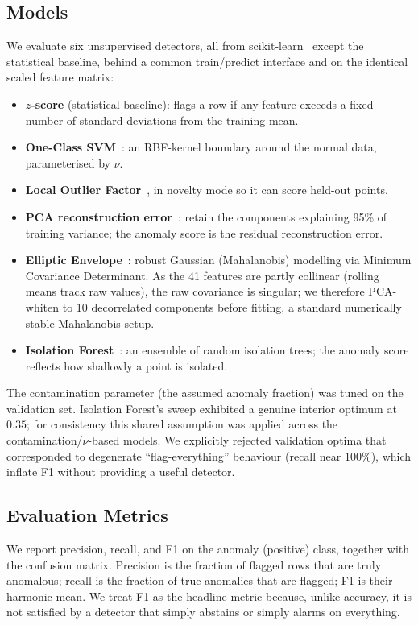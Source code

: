 \documentclass[conference]{IEEEtran}
\begin{document}
\subsection{Models}
We evaluate six unsupervised detectors, all from
scikit-learn~\cite{pedregosa2011} except the statistical baseline, behind a
common train/predict interface and on the identical scaled feature matrix:
\begin{itemize}
\item \textbf{$z$-score} (statistical baseline): flags a row if any feature
exceeds a fixed number of standard deviations from the training mean.
\item \textbf{One-Class SVM}~\cite{scholkopf2001}: an RBF-kernel boundary around
the normal data, parameterised by $\nu$.
\item \textbf{Local Outlier Factor}~\cite{breunig2000}, in novelty mode so it
can score held-out points.
\item \textbf{PCA reconstruction error}~\cite{shyu2003}: retain the components
explaining 95\% of training variance; the anomaly score is the residual
reconstruction error.
\item \textbf{Elliptic Envelope}~\cite{rousseeuw1999}: robust Gaussian
(Mahalanobis) modelling via Minimum Covariance Determinant. As the 41 features
are partly collinear (rolling means track raw values), the raw covariance is
singular; we therefore PCA-whiten to 10 decorrelated components before fitting,
a standard numerically stable Mahalanobis setup.
\item \textbf{Isolation Forest}~\cite{liu2008}: an ensemble of random isolation
trees; the anomaly score reflects how shallowly a point is isolated.
\end{itemize}
The contamination parameter (the assumed anomaly fraction) was tuned on the
validation set. Isolation Forest's sweep exhibited a genuine interior optimum at
$0.35$; for consistency this shared assumption was applied across the
contamination/$\nu$-based models. We explicitly rejected validation optima that
corresponded to degenerate ``flag-everything'' behaviour (recall near $100\%$),
which inflate F1 without providing a useful detector.

\subsection{Evaluation Metrics}
We report precision, recall, and F1 on the anomaly (positive) class, together
with the confusion matrix. Precision is the fraction of flagged rows that are
truly anomalous; recall is the fraction of true anomalies that are flagged; F1
is their harmonic mean. We treat F1 as the headline metric because, unlike
accuracy, it is not satisfied by a detector that simply abstains or simply
alarms on everything.
\end{document}
